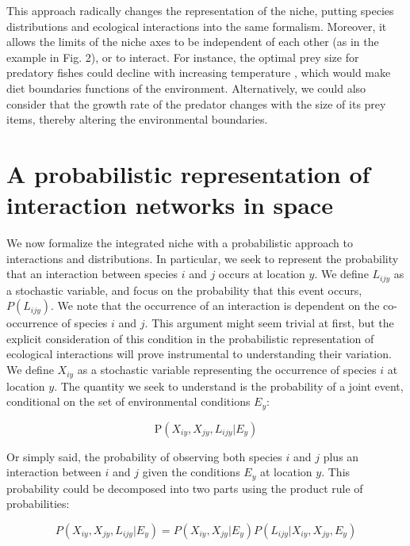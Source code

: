 \documentclass[12pt]{article}
\begin{document}
This approach radically changes the representation of the niche, putting species
distributions and ecological interactions into the same formalism.
Moreover, it allows the limits of the niche axes to be independent of each other (as in the
example in Fig. 2), or to interact. For instance, the optimal
prey size for predatory fishes could decline with increasing temperature
\citep{Lelong2015}, which would make diet boundaries functions of the
environment. Alternatively, we could also consider that the growth rate
of the predator changes with the size of its prey items, thereby altering the
environmental boundaries.

\section*{A probabilistic representation of interaction networks in space}

We now formalize the integrated niche with a probabilistic approach to
interactions and distributions. In particular, we seek to represent the
probability that an interaction between species $i$ and $j$ occurs at location
$y$. We define $L_{ijy}$ as a stochastic variable, and focus on the
probability that this event occurs, $P(L_{ijy})$. We note that the occurrence
of an interaction is dependent on the co-occurrence of species $i$ and $j$.
This argument might seem trivial at first, but the explicit consideration of
this condition in the probabilistic representation of ecological interactions
will prove instrumental to understanding their variation. We define $X_{iy}$
as a stochastic variable representing the occurrence of species $i$ at
location $y$. The quantity we seek to understand is the probability of a joint
event, conditional on the set of environmental conditions $E_y$:

\begin{equation}
	\text{P}(X_{iy},X_{jy},L_{ijy}|E_y)
\end{equation}

Or simply said, the probability of observing both species $i$ and $j$ plus an
interaction between $i$ and $j$ given the conditions $E_y$ at location $y$.
This probability could be decomposed into two parts using the product rule of
probabilities:

\begin{equation}
	P(X_{iy},X_{jy},L_{ijy}|E_y)=P(X_{iy},X_{jy}|E_y)P(L_{ijy}|X_{iy},X_{jy},E_y)
\end{equation}
\end{document}
